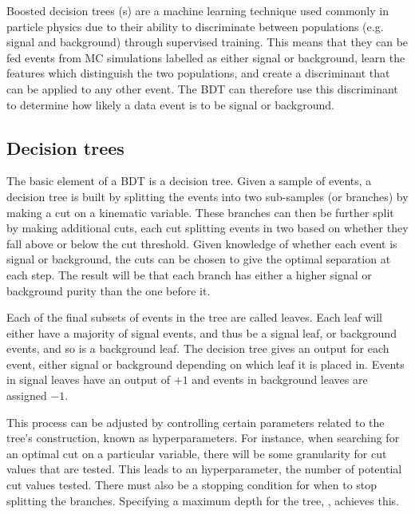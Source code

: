 
Boosted decision trees ({}s) are a machine learning technique used
commonly in particle physics due to their ability to discriminate between
populations (e.g. signal and background) through supervised training. This means
that they can be fed events from \ac{MC} simulations labelled as either signal
or background, learn the features which distinguish the two populations, and
create a discriminant that can be applied to any other event. The \ac{BDT} can
therefore use this discriminant to determine how likely a data event is to be
signal or background.

\subsection{Decision trees}
\label{sec:methods-bdt-trees}

The basic element of a \ac{BDT} is a decision tree. Given a sample of events, a
decision tree is built by splitting the events into two sub-samples (or
branches) by making a cut on a kinematic variable. These branches can then be
further split by making additional cuts, each cut splitting events in two based
on whether they fall above or below the cut threshold. Given knowledge of
whether each event is signal or background, the cuts can be chosen to give the
optimal separation at each step. The result will be that each branch has either
a higher signal or background purity than the one before it.

Each of the final subsets of events in the tree are called leaves. Each leaf
will either have a majority of signal events, and thus be a signal leaf, or
background events, and so is a background leaf. The decision tree gives an
output for each event, either signal or background depending on which leaf it is
placed in. Events in signal leaves have an output of $+1$ and events in
background leaves are assigned $-1$.

This process can be adjusted by controlling certain parameters related to the
tree's construction, known as hyperparameters. For instance, when searching for
an optimal cut on a particular variable, there will be some granularity for cut
values that are tested. This leads to an \ncuts hyperparameter, the number of
potential cut values tested. There must also be a stopping condition for when to
stop splitting the branches. Specifying a maximum depth for the tree, \dmax,
achieves this.

